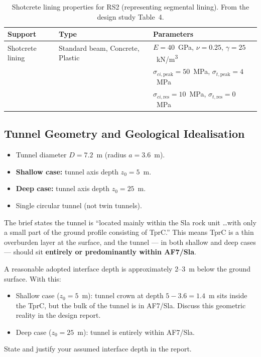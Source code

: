 \begin{table}[h!]
\centering
\small
\begin{tabular}{l l l}
\toprule
\textbf{Support} & \textbf{Type} & \textbf{Parameters} \\
\midrule
Shotcrete lining & Standard beam, Concrete, Plastic & $E = 40$~GPa, $\nu = 0.25$, $\gamma = 25$~kN/m\textsuperscript{3} \\
 & & $\sigma_{ci,\text{peak}} = 50$~MPa, $\sigma_{t,\text{peak}} = 4$~MPa \\
 & & $\sigma_{ci,\text{res}} = 10$~MPa, $\sigma_{t,\text{res}} = 0$~MPa \\
\bottomrule
\end{tabular}
\caption{Shotcrete lining properties for RS2 (representing segmental lining). From the design study Table~4.}
\label{tab:lining}
\end{table}

\subsection{Tunnel Geometry and Geological Idealisation}
\begin{itemize}
 \item Tunnel diameter $D = 7.2$~m (radius $a = 3.6$~m).
 \item \textbf{Shallow case:} tunnel axis depth $z_0 = 5$~m.
 \item \textbf{Deep case:} tunnel axis depth $z_0 = 25$~m.
 \item Single circular tunnel (not twin tunnels).
\end{itemize}

\begin{notebox}
The brief states the tunnel is ``located mainly within the Sla rock unit \dots with only a small part of the ground profile consisting of TprC.'' This means TprC is a thin overburden layer at the surface, and the tunnel --- in both shallow and deep cases --- should sit \textbf{entirely or predominantly within AF7/Sla}.
\vspace{0.5em}

A reasonable adopted interface depth is approximately 2--3~m below the ground surface. With this:
\begin{itemize}[nosep]
 \item Shallow case ($z_0 = 5$~m): tunnel crown at depth $5 - 3.6 = 1.4$~m sits inside the TprC, but the bulk of the tunnel is in AF7/Sla. Discuss this geometric reality in the design report.
 \item Deep case ($z_0 = 25$~m): tunnel is entirely within AF7/Sla.
\end{itemize}
\vspace{0.5em}

State and justify your assumed interface depth in the report.
\end{notebox}

